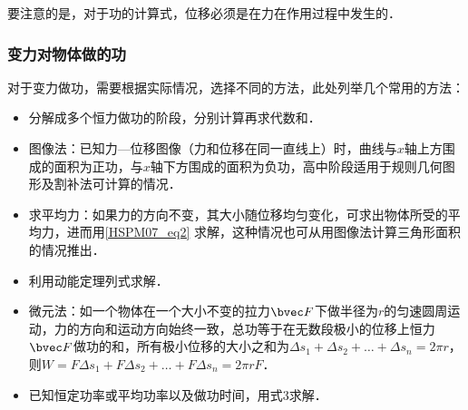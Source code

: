 要注意的是，对于功的计算式，位移必须是在力在作用过程中发生的．

\subsubsection{变力对物体做的功}

对于变力做功，需要根据实际情况，选择不同的方法，此处列举几个常用的方法：


\begin{itemize}
\item 分解成多个恒力做功的阶段，分别计算再求代数和．
\item 图像法：已知力—位移图像（力和位移在同一直线上）时，曲线与$x$轴上方围成的面积为正功，与$x$轴下方围成的面积为负功，高中阶段适用于规则几何图形及割补法可计算的情况．
\item 求平均力：如果力的方向不变，其大小随位移均匀变化，可求出物体所受的平均力，进而用\autoref{HSPM07_eq2} 求解，这种情况也可从用图像法计算三角形面积的情况推出．
\item 利用动能定理列式求解．
\item 微元法：如一个物体在一个大小不变的拉力$\bvec F$下做半径为$r$的匀速圆周运动，力的方向和运动方向始终一致，总功等于在无数段极小的位移上恒力$\bvec F$做功的和，所有极小位移的大小之和为$\Delta s_1+\Delta s_2+\dots+\Delta s_n=2\pi r$，则$W=F\Delta s_1+F\Delta s_2+\dots+F\Delta s_n=2\pi rF$．
\item 已知恒定功率或平均功率以及做功时间，用式3求解．
\end{itemize}
